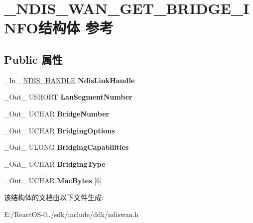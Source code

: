\hypertarget{struct___n_d_i_s___w_a_n___g_e_t___b_r_i_d_g_e___i_n_f_o}{}\section{\+\_\+\+N\+D\+I\+S\+\_\+\+W\+A\+N\+\_\+\+G\+E\+T\+\_\+\+B\+R\+I\+D\+G\+E\+\_\+\+I\+N\+F\+O结构体 参考}
\label{struct___n_d_i_s___w_a_n___g_e_t___b_r_i_d_g_e___i_n_f_o}
\subsection*{Public 属性}
\begin{DoxyCompactItemize}
\item 
\mbox{\label{struct___n_d_i_s___w_a_n___g_e_t___b_r_i_d_g_e___i_n_f_o_ad89cffe4d1e8a8d82571281e35513c9e}} 
\+\_\+\+In\+\_\+ \hyperlink{interfacevoid}{N\+D\+I\+S\+\_\+\+H\+A\+N\+D\+LE} {\bfseries Ndis\+Link\+Handle}
\item 
\mbox{\label{struct___n_d_i_s___w_a_n___g_e_t___b_r_i_d_g_e___i_n_f_o_a772dbd55043861907b464417655ae1a4}} 
\+\_\+\+Out\+\_\+ U\+S\+H\+O\+RT {\bfseries Lan\+Segment\+Number}
\item 
\mbox{\label{struct___n_d_i_s___w_a_n___g_e_t___b_r_i_d_g_e___i_n_f_o_a5b1e8f216a94632a7371d976c79ffbf7}} 
\+\_\+\+Out\+\_\+ U\+C\+H\+AR {\bfseries Bridge\+Number}
\item 
\mbox{\label{struct___n_d_i_s___w_a_n___g_e_t___b_r_i_d_g_e___i_n_f_o_aa17028f0d95616bfb4b8d29056fd0632}} 
\+\_\+\+Out\+\_\+ U\+C\+H\+AR {\bfseries Bridging\+Options}
\item 
\mbox{\label{struct___n_d_i_s___w_a_n___g_e_t___b_r_i_d_g_e___i_n_f_o_ab5a257eb632f1a1c784ba6f666c915a4}} 
\+\_\+\+Out\+\_\+ U\+L\+O\+NG {\bfseries Bridging\+Capabilities}
\item 
\mbox{\label{struct___n_d_i_s___w_a_n___g_e_t___b_r_i_d_g_e___i_n_f_o_a2129a5b32364f0df739ad38197c4a5d2}} 
\+\_\+\+Out\+\_\+ U\+C\+H\+AR {\bfseries Bridging\+Type}
\item 
\mbox{\label{struct___n_d_i_s___w_a_n___g_e_t___b_r_i_d_g_e___i_n_f_o_a44392a70bc0186037d8d2441ea67cbc4}} 
\+\_\+\+Out\+\_\+ U\+C\+H\+AR {\bfseries Mac\+Bytes} \mbox{[}6\mbox{]}
\end{DoxyCompactItemize}


该结构体的文档由以下文件生成\+:\begin{DoxyCompactItemize}
\item 
E\+:/\+React\+O\+S-\/0../sdk/include/ddk/ndiswan.\+h\end{DoxyCompactItemize}

